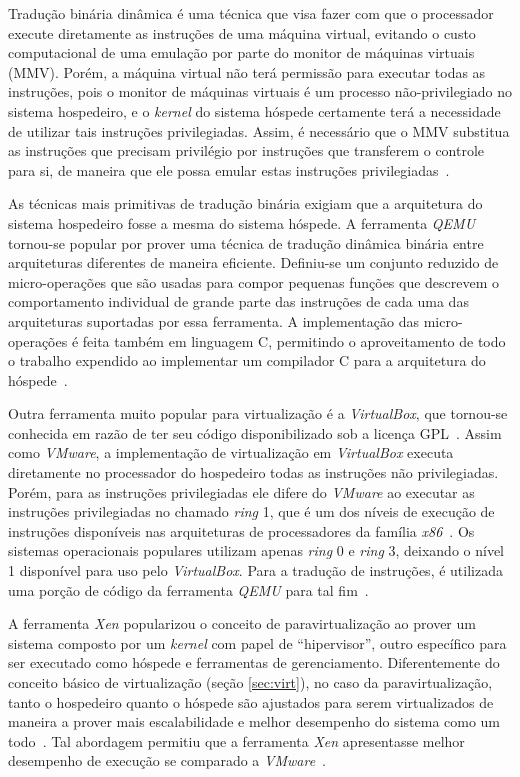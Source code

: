 Tradução binária dinâmica é uma técnica que visa fazer com que o processador
execute diretamente as instruções de uma máquina virtual, evitando o
custo computacional de uma emulação por parte do monitor de máquinas
virtuais (MMV). Porém, a máquina virtual não terá permissão para executar
todas as instruções, pois o monitor de máquinas virtuais é um processo
não-privilegiado no sistema hospedeiro, e o \emph{kernel} do sistema
hóspede certamente terá a necessidade de utilizar tais instruções
privilegiadas. Assim, é necessário que o MMV substitua as instruções que
precisam privilégio por instruções que transferem o controle para si, de
maneira que ele possa emular estas instruções
privilegiadas~\cite{ung2000machine}.

As técnicas mais primitivas de tradução binária exigiam que a arquitetura
do sistema hospedeiro fosse a mesma do sistema hóspede. A ferramenta
\emph{QEMU} tornou-se popular por prover uma técnica de
tradução dinâmica binária entre arquiteturas diferentes de maneira
eficiente. Definiu-se um conjunto reduzido de micro-operações que
são usadas para compor pequenas funções que descrevem o comportamento
individual de grande parte das instruções de cada uma das arquiteturas
suportadas por essa ferramenta. A implementação das micro-operações é feita
também em linguagem C, permitindo o aproveitamento de todo o
trabalho expendido ao implementar um compilador C para a arquitetura do
hóspede~\cite{bellard2005qemu}.

Outra ferramenta muito popular para virtualização é a
\emph{VirtualBox}, que tornou-se conhecida
em razão de ter seu código disponibilizado sob a licença
GPL~\cite{watson2008virtualbox}. Assim como \emph{VMware}, a implementação de
virtualização em \emph{VirtualBox} executa diretamente no processador do
hospedeiro todas as instruções não privilegiadas. Porém, para as instruções
privilegiadas ele difere do \emph{VMware} ao executar as instruções
privilegiadas no chamado \emph{ring} 1, que é um dos níveis de execução de
instruções disponíveis nas arquiteturas de processadores da família
\emph{x86}~\cite{uhlig2005intel}. Os sistemas operacionais populares utilizam
apenas \emph{ring} 0 e \emph{ring} 3, deixando o nível 1 disponível para uso
pelo \emph{VirtualBox}. Para a tradução de instruções, é utilizada uma porção
de código da ferramenta \emph{QEMU} para tal fim~\cite{virtualboxTech}.

A ferramenta \emph{Xen} popularizou o conceito de
paravirtualização ao prover um sistema composto por um \emph{kernel} com papel
de “hipervisor”, outro específico para ser executado como hóspede e ferramentas
de gerenciamento. Diferentemente do conceito básico de virtualização
(seção \ref{sec:virt}), no caso da paravirtualização, tanto o hospedeiro
quanto o hóspede são ajustados para serem virtualizados de maneira a prover
mais escalabilidade e melhor desempenho do sistema como um
todo~\cite{whitaker2002denali}. Tal abordagem permitiu que a ferramenta
\emph{Xen} apresentasse melhor desempenho de execução se comparado a
\emph{VMware}~\cite{barham2003xen}.

